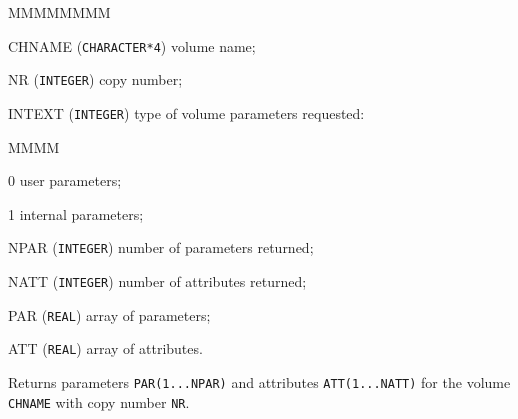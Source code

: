 \begin{DLtt}{MMMMMMMM}
\item[CHNAME]  ({\tt CHARACTER*4}) volume name;
\item[NR]      ({\tt INTEGER}) copy number;
\item[INTEXT] ({\tt INTEGER}) type of volume parameters requested:
\begin{DLtt}{MMMM}
\item[0] user parameters;
\item[1] internal parameters;
\end{DLtt}
\item[NPAR] ({\tt INTEGER}) number of parameters returned;
\item[NATT] ({\tt INTEGER}) number of attributes returned;
\item[PAR]  ({\tt REAL}) array of parameters;
\item[ATT] ({\tt REAL}) array of attributes.
\end{DLtt}
Returns parameters {\tt PAR(1...NPAR)} and
attributes {\tt ATT(1...NATT)} for the volume {\tt CHNAME} with copy number
{\tt NR}.
